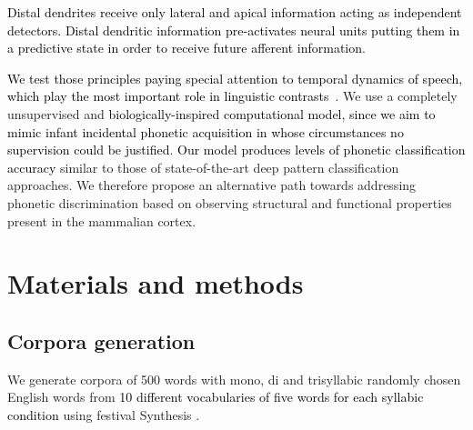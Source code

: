 \documentclass[10pt,letterpaper]{article}
\newcommand{\reviewertwo}[1]{\textcolor{black}{#1}}
\newcommand{\reviewerfour}[1]{\textcolor{black}{#1}}
\newcommand{\reviewerfive}[1]{\textcolor{black}{#1}}
\begin{document}
\reviewerfive{Distal dendrites receive only lateral and apical information acting as independent detectors. Distal dendritic information pre-activates neural units putting them in a predictive state in order to receive future afferent information}.

\reviewerfive{We test those principles paying special attention to temporal dynamics of speech, which play the most important role in linguistic contrasts~\cite{doi:10.1098/rstb.1992.0070}}. We use a completely unsupervised and \reviewertwo{biologically-inspired computational model,} \reviewerfour{since we aim to mimic infant incidental phonetic acquisition in whose circumstances no supervision could be justified}. \reviewertwo{Our model produces levels of phonetic classification accuracy} similar to those of state-of-the-art deep pattern classification approaches. We therefore propose an alternative path towards addressing phonetic discrimination based on observing structural and functional properties present in the mammalian cortex.


















\section*{Materials and methods}


\subsection*{Corpora generation}
\label{CorpGen}

We generate corpora of 500 words with mono, di and trisyllabic randomly chosen English words from \reviewerfour{10 different vocabularies of five words
for each syllabic condition} using \gls{festival} Synthesis \cite{festival2014}.

\end{document}

